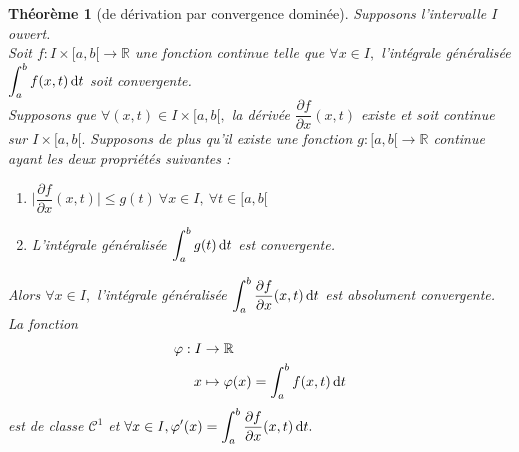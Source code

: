 \documentclass[11pt, a4paper]{book}
\newtheorem{teo}{Th\'eor\`eme}[section]
\begin{document}
\begin{teo}[de d\'erivation par convergence domin\'ee] \label{teo6.4.2}
Supposons l'intervalle $I$ ouvert.\\
Soit $f:I\times[a,b[\rightarrow\mathbb{R}$ une fonction continue telle que $\forall x\in I,$ l'int\'egrale g\'en\'eralis\'ee ${\displaystyle \int_a^bf(x,t)\,\mathrm{d} t}$ soit convergente.\\ Supposons que $\forall (x,t)\in I\times[a,b[,$ la d\'eriv\'ee $\dfrac{\partial f}{\partial x}(x,t)$ existe et soit continue sur $I\times[a,b[.$ Supposons de plus qu'il existe une fonction $g:[a,b[\rightarrow\mathbb{R}$ continue ayant les deux propri\'et\'es suivantes :
\begin{enumerate}
\item $\Big|\dfrac{\partial f}{\partial x}(x,t)\Big|\leq g(t)~\forall x\in I,~\forall t\in[a,b[$
\item L'int\'egrale g\'en\'eralis\'ee ${\displaystyle \int_a^bg(t)\,\mathrm{d} t}$ est convergente.
\end{enumerate}
Alors $\forall x\in I,$ l'int\'egrale g\'en\'eralis\'ee ${\displaystyle \int_a^b\dfrac{\partial f}{\partial x}(x,t)\,\mathrm{d} t}$ est absolument convergente. La fonction \begin{align*}
\varphi:I&\rightarrow\mathbb{R}\\x&\mapsto \varphi(x)=\int_a^bf(x,t)\,\mathrm{d} t
\end{align*} est de classe $\mathcal{C}^1$ et $\forall x\in I,{\displaystyle \varphi'(x)=\int_a^b\dfrac{\partial f}{\partial x}(x,t)\,\mathrm{d} t.}$
\end{teo}
\end{document}
